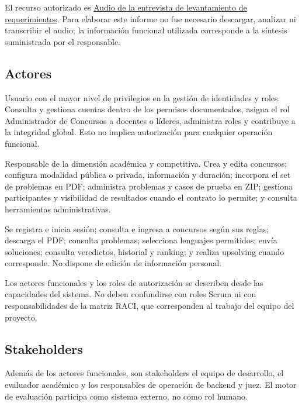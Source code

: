 \documentclass[11pt,a4paper]{article}
\begin{document}
El recurso autorizado es \href{https://drive.google.com/file/d/11f3wTCXvLU2kvgIwGbDxx9W_j6ErCma9/view?usp=drivesdk}{Audio de la entrevista de levantamiento de requerimientos}. Para elaborar este informe no fue necesario descargar, analizar ni transcribir el audio; la información funcional utilizada corresponde a la síntesis suministrada por el responsable.

\subsection{Actores}
\begin{description}[style=nextline]
\item[Administrador de Roles --- docente o líder de club.] Usuario con el mayor nivel de privilegios en la gestión de identidades y roles. Consulta y gestiona cuentas dentro de los permisos documentados, asigna el rol Administrador de Concursos a docentes o líderes, administra roles y contribuye a la integridad global. Esto no implica autorización para cualquier operación funcional.
\item[Administrador de Concursos --- docente u organizador.] Responsable de la dimensión académica y competitiva. Crea y edita concursos; configura modalidad pública o privada, información y duración; incorpora el set de problemas en PDF; administra problemas y casos de prueba en ZIP; gestiona participantes y visibilidad de resultados cuando el contrato lo permite; y consulta herramientas administrativas.
\item[Usuario --- estudiante o participante.] Se registra e inicia sesión; consulta e ingresa a concursos según sus reglas; descarga el PDF; consulta problemas; selecciona lenguajes permitidos; envía soluciones; consulta veredictos, historial y ranking; y realiza upsolving cuando corresponde. No dispone de edición de información personal.
\end{description}
Los actores funcionales y los roles de autorización se describen desde las capacidades del sistema. No deben confundirse con roles Scrum ni con responsabilidades de la matriz RACI, que corresponden al trabajo del equipo del proyecto.

\subsection{Stakeholders}
Además de los actores funcionales, son stakeholders el equipo de desarrollo, el evaluador académico y los responsables de operación de backend y juez. El motor de evaluación participa como sistema externo, no como rol humano.
\end{document}
